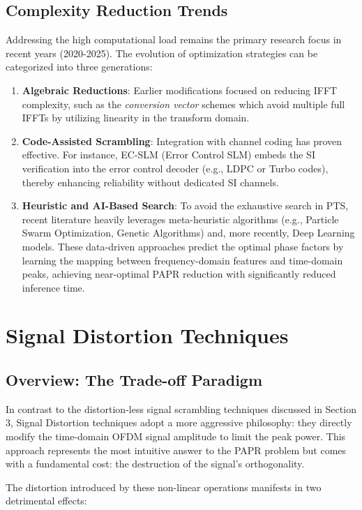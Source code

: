 \documentclass[conference]{IEEEtran}
\begin{document}
\subsection{Complexity Reduction Trends}
Addressing the high computational load remains the primary research focus in recent years (2020-2025). The evolution of optimization strategies can be categorized into three generations:

\begin{enumerate}
    \item \textbf{Algebraic Reductions}: Earlier modifications focused on reducing IFFT complexity, such as the \textit{conversion vector} schemes \cite{ref7} which avoid multiple full IFFTs by utilizing linearity in the transform domain.
    \item \textbf{Code-Assisted Scrambling}: Integration with channel coding has proven effective. For instance, EC-SLM (Error Control SLM) \cite{ref8} embeds the SI verification into the error control decoder (e.g., LDPC or Turbo codes), thereby enhancing reliability without dedicated SI channels.
    \item \textbf{Heuristic and AI-Based Search}: To avoid the exhaustive search in PTS, recent literature heavily leverages meta-heuristic algorithms (e.g., Particle Swarm Optimization, Genetic Algorithms) and, more recently, Deep Learning models. These data-driven approaches predict the optimal phase factors by learning the mapping between frequency-domain features and time-domain peaks, achieving near-optimal PAPR reduction with significantly reduced inference time.
\end{enumerate}

\section{Signal Distortion Techniques}

\subsection{Overview: The Trade-off Paradigm}
In contrast to the distortion-less signal scrambling techniques discussed in Section 3, Signal Distortion techniques adopt a more aggressive philosophy: they directly modify the time-domain OFDM signal amplitude to limit the peak power. This approach represents the most intuitive answer to the PAPR problem but comes with a fundamental cost: the destruction of the signal's orthogonality.

The distortion introduced by these non-linear operations manifests in two detrimental effects:
\end{document}
